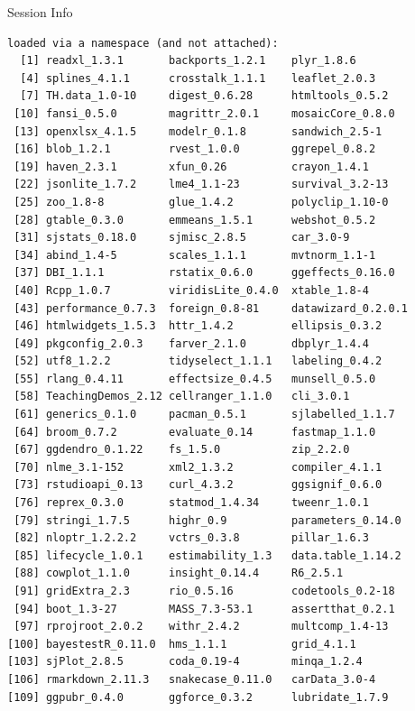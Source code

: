 \documentclass[10pt,handout]{beamer}\usepackage[]{graphicx}\usepackage[]{color}
\makeatletter
\newenvironment{kframe}{%
 \def\at@end@of@kframe{}%
 \ifinner\ifhmode%
  \def\at@end@of@kframe{\end{minipage}}%
  \begin{minipage}{\columnwidth}%
 \fi\fi%
 \def\FrameCommand##1{\hskip\@totalleftmargin \hskip-\fboxsep
 \colorbox{shadecolor}{##1}\hskip-\fboxsep
     \hskip-\linewidth \hskip-\@totalleftmargin \hskip\columnwidth}%
 \MakeFramed {\advance\hsize-\width
   \@totalleftmargin\z@ \linewidth\hsize
   \@setminipage}}%
 {\par\unskip\endMakeFramed%
 \at@end@of@kframe}
\newenvironment{knitrout}{}{} %
\makeatother
\begin{document}
\begin{frame}[fragile]{Session Info}
\begin{knitrout}
\begin{kframe}
\begin{verbatim}
loaded via a namespace (and not attached):
  [1] readxl_1.3.1       backports_1.2.1    plyr_1.8.6        
  [4] splines_4.1.1      crosstalk_1.1.1    leaflet_2.0.3     
  [7] TH.data_1.0-10     digest_0.6.28      htmltools_0.5.2   
 [10] fansi_0.5.0        magrittr_2.0.1     mosaicCore_0.8.0  
 [13] openxlsx_4.1.5     modelr_0.1.8       sandwich_2.5-1    
 [16] blob_1.2.1         rvest_1.0.0        ggrepel_0.8.2     
 [19] haven_2.3.1        xfun_0.26          crayon_1.4.1      
 [22] jsonlite_1.7.2     lme4_1.1-23        survival_3.2-13   
 [25] zoo_1.8-8          glue_1.4.2         polyclip_1.10-0   
 [28] gtable_0.3.0       emmeans_1.5.1      webshot_0.5.2     
 [31] sjstats_0.18.0     sjmisc_2.8.5       car_3.0-9         
 [34] abind_1.4-5        scales_1.1.1       mvtnorm_1.1-1     
 [37] DBI_1.1.1          rstatix_0.6.0      ggeffects_0.16.0  
 [40] Rcpp_1.0.7         viridisLite_0.4.0  xtable_1.8-4      
 [43] performance_0.7.3  foreign_0.8-81     datawizard_0.2.0.1
 [46] htmlwidgets_1.5.3  httr_1.4.2         ellipsis_0.3.2    
 [49] pkgconfig_2.0.3    farver_2.1.0       dbplyr_1.4.4      
 [52] utf8_1.2.2         tidyselect_1.1.1   labeling_0.4.2    
 [55] rlang_0.4.11       effectsize_0.4.5   munsell_0.5.0     
 [58] TeachingDemos_2.12 cellranger_1.1.0   cli_3.0.1         
 [61] generics_0.1.0     pacman_0.5.1       sjlabelled_1.1.7  
 [64] broom_0.7.2        evaluate_0.14      fastmap_1.1.0     
 [67] ggdendro_0.1.22    fs_1.5.0           zip_2.2.0         
 [70] nlme_3.1-152       xml2_1.3.2         compiler_4.1.1    
 [73] rstudioapi_0.13    curl_4.3.2         ggsignif_0.6.0    
 [76] reprex_0.3.0       statmod_1.4.34     tweenr_1.0.1      
 [79] stringi_1.7.5      highr_0.9          parameters_0.14.0 
 [82] nloptr_1.2.2.2     vctrs_0.3.8        pillar_1.6.3      
 [85] lifecycle_1.0.1    estimability_1.3   data.table_1.14.2 
 [88] cowplot_1.1.0      insight_0.14.4     R6_2.5.1          
 [91] gridExtra_2.3      rio_0.5.16         codetools_0.2-18  
 [94] boot_1.3-27        MASS_7.3-53.1      assertthat_0.2.1  
 [97] rprojroot_2.0.2    withr_2.4.2        multcomp_1.4-13   
[100] bayestestR_0.11.0  hms_1.1.1          grid_4.1.1        
[103] sjPlot_2.8.5       coda_0.19-4        minqa_1.2.4       
[106] rmarkdown_2.11.3   snakecase_0.11.0   carData_3.0-4     
[109] ggpubr_0.4.0       ggforce_0.3.2      lubridate_1.7.9   
\end{verbatim}
\end{kframe}
\end{knitrout}
	
\end{frame}
\end{document}
